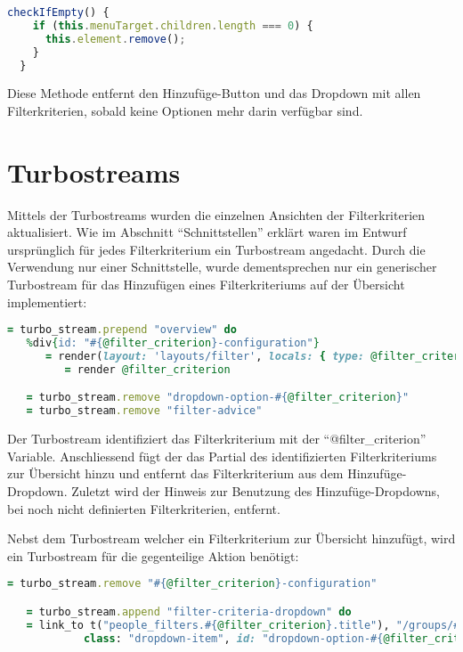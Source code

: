 \begin{lstlisting}[language=JavaScript]
   checkIfEmpty() {
    if (this.menuTarget.children.length === 0) {
      this.element.remove();
    }
  }
\end{lstlisting}

Diese Methode entfernt den Hinzufüge-Button und das Dropdown mit allen Filterkriterien, sobald keine Optionen mehr darin verfügbar sind.

\section{Turbostreams}
Mittels der Turbostreams wurden die einzelnen Ansichten der Filterkriterien aktualisiert. Wie im Abschnitt ``Schnittstellen'' erklärt waren im Entwurf
ursprünglich für jedes Filterkriterium ein Turbostream angedacht. Durch die Verwendung nur einer Schnittstelle, wurde dementsprechen nur ein generischer Turbostream für 
das Hinzufügen eines Filterkriteriums auf der Übersicht implementiert: 
\newline

\begin{lstlisting}[language=Ruby]
   = turbo_stream.prepend "overview" do
   %div{id: "#{@filter_criterion}-configuration"}
      = render(layout: 'layouts/filter', locals: { type: @filter_criterion.to_sym }) do
         = render @filter_criterion

   = turbo_stream.remove "dropdown-option-#{@filter_criterion}"
   = turbo_stream.remove "filter-advice"
\end{lstlisting}

Der Turbostream identifiziert das Filterkriterium mit der ``@filter\_criterion'' Variable.
Anschliessend fügt der das Partial des identifizierten Filterkriteriums zur Übersicht hinzu und entfernt das Filterkriterium
aus dem Hinzufüge-Dropdown. Zuletzt wird der Hinweis zur Benutzung des Hinzufüge-Dropdowns, bei noch nicht definierten Filterkriterien, entfernt.

\newpage

Nebst dem Turbostream welcher ein Filterkriterium zur Übersicht hinzufügt, wird ein Turbostream für die gegenteilige Aktion 
benötigt:
\newline

\begin{lstlisting}[language=Ruby]
   = turbo_stream.remove "#{@filter_criterion}-configuration"

   = turbo_stream.append "filter-criteria-dropdown" do
   = link_to t("people_filters.#{@filter_criterion}.title"), "/groups/#{@group.id}/people_filters/#{@filter_criterion}",
            class: "dropdown-item", id: "dropdown-option-#{@filter_criterion}", data: {turbo_stream: true}
\end{lstlisting}

